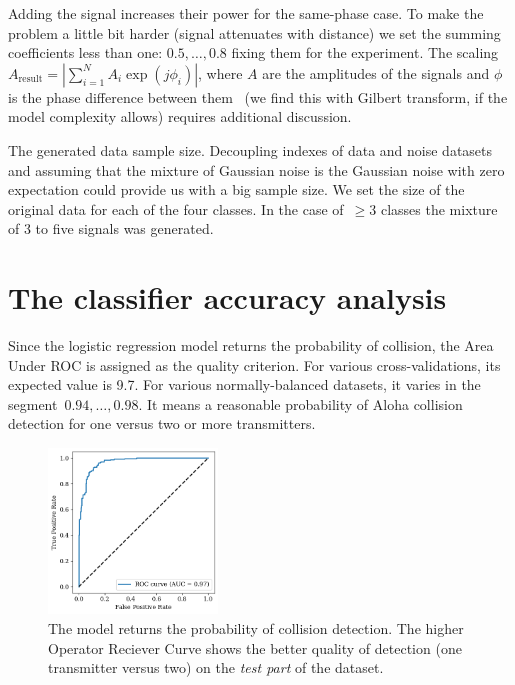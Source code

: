 \documentclass[12pt]{article}
\begin{document}
Adding the signal increases their power for the same-phase case. To make the problem a little bit harder (signal attenuates with distance) we set the summing coefficients less than one: $0.5,\ldots,0.8$ fixing them for the experiment. The scaling $A_\text{result} = \left| \sum_{i=1}^{N} A_i \exp({j\phi_i}) \right|$, where $A$ are the amplitudes of the signals and $\phi$ is the phase difference between them~\cite{Balanis2005} (we find this with Gilbert transform, if the model complexity allows)  requires additional discussion.

The generated data sample size. Decoupling indexes of data and noise datasets and assuming that the mixture of Gaussian noise is the Gaussian noise with zero expectation could provide us with a big sample size. We set the size of the original data for each of the four classes.  In the case of~$\geq 3$ classes the mixture of 3 to five signals was generated.

\section{The classifier accuracy analysis}

Since the logistic regression model returns the probability of collision, the Area Under ROC is assigned as the quality criterion. For various cross-validations, its expected value is 9.7. For various normally-balanced datasets, it varies in the segment~$0.94,\ldots,0.98$. It means a reasonable probability of Aloha collision detection for one versus two or more transmitters. 

\begin{figure}[!tb]
\centering
\includegraphics[width=0.4\textwidth]{fig_ROC_1v2}
\caption{The model returns the probability of collision detection. The higher Operator Reciever Curve shows the better quality of detection (one transmitter versus two) on the \emph{test part} of the dataset.}
\label{fig:AUC_1v2}
\end{figure}
\end{document}
